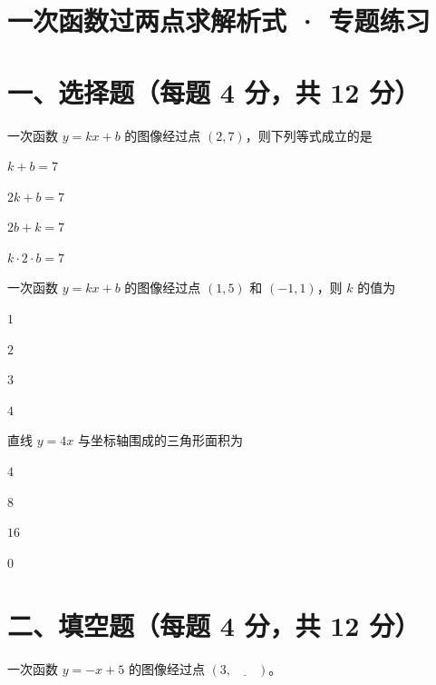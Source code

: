\documentclass{exam-zh}
\begin{document}
\section*{一次函数过两点求解析式 · 专题练习}

\section*{一、选择题（每题 4 分，共 12 分）}


\begin{question}[points=4]
  一次函数 $y = kx + b$ 的图像经过点 $(2, 7)$，则下列等式成立的是
  \begin{choices}
    \item $k + b = 7$
    \item $2k + b = 7$
    \item $2b + k = 7$
    \item $k \cdot 2 \cdot b = 7$
  \end{choices}
\end{question}



\begin{question}[points=4]
  一次函数 $y = kx + b$ 的图像经过点 $(1, 5)$ 和 $(-1, 1)$，则 $k$ 的值为
  \begin{choices}
    \item $1$
    \item $2$
    \item $3$
    \item $4$
  \end{choices}
\end{question}



\begin{question}[points=4]
  直线 $y = 4x$ 与坐标轴围成的三角形面积为
  \begin{choices}
    \item $4$
    \item $8$
    \item $16$
    \item $0$
  \end{choices}
\end{question}


\section*{二、填空题（每题 4 分，共 12 分）}


\begin{question}[points=4]
  一次函数 $y = -x + 5$ 的图像经过点 $(3, \underline{\quad\quad})$。
  \fillin
\end{question}
\end{document}

